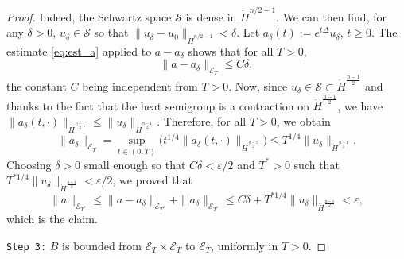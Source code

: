 \documentclass[a4paper, 12pt]{article}
\theoremstyle{plain}
\theoremstyle{definition}
\theoremstyle{remark}
\numberwithin{equation}{section}
\begin{document}
\begin{proof}
Indeed, the Schwartz space ${\mathscr{S}}$ is dense in $\dot H^{n/2-1}$. We can then find, 
for any $\delta >0$, $u_\delta\in{\mathscr{S}}$ so that 
$\|u_\delta-u_0\|_{\dot H^{n/2-1}}<\delta$. Let 
$a_\delta(t):=e^{t\Delta}u_\delta$, $t\ge 0$.
The estimate \eqref{eq:est_a} applied to $a-a_\delta$ shows that for all $T>0$,
\[
\|a-a_\delta\|_{{\mathscr{E}}_T}\le C\delta,
\]
the constant $C$ being independent from $T>0$.
Now, since $u_\delta\in{\mathscr{S}}\subset \dot H^{\frac{n-1}{2}}$ and thanks to the fact 
that the heat semigroup is a contraction on $\dot H^{\frac{n-1}{2}}$, we have 
$\|a_\delta(t,\cdot)\|_{\dot H^{\frac{n-1}{2}}}\le \|u_\delta\|_{\dot H^{\frac{n-1}{2}}}$. Therefore, for all $T>0$, we obtain
\[
\|a_\delta\|_{{\mathscr{E}}_T}=\sup_{t\in(0,T)}\bigl(t^{1/4}\|a_{\delta}(t,\cdot)\|_{\dot H^{\frac{n-1}{2}}}\bigr)
\le T^{1/4} \|u_\delta\|_{\dot H^{\frac{n-1}{2}}}.
\]
Choosing $\delta>0$ small enough so that $C\delta<\varepsilon/2$ and $T^*>0$ such
that $T^{*1/4} \|u_\delta\|_{\dot H^{\frac{n-1}{2}}}<\varepsilon/2$, we proved that
\[
\|a\|_{{\mathscr{E}}_{T^*}}\le \|a-a_\delta\|_{{\mathscr{E}}_{T^*}}+\|a_\delta\|_{{\mathscr{E}}_{T^*}}
\le C\delta+T^{*1/4} \|u_\delta\|_{\dot H^{\frac{n-1}{2}}}<\varepsilon,
\]
which is the claim.

\medskip

\noindent
{\tt Step 3:} $B$ is bounded from ${\mathscr{E}}_{T}\times{\mathscr{E}}_{T}$ to 
${\mathscr{E}}_{T}$, uniformly in $T>0$.


\end{proof}
\end{document}
